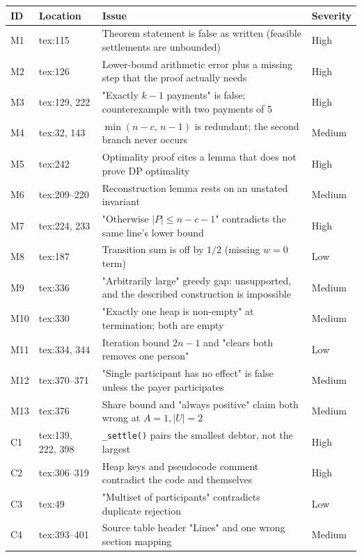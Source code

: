 \documentclass[11pt]{article}
\begin{document}
\begin{table}[H]
\centering
\begin{tabular}{>{\raggedright\arraybackslash}p{} >{\raggedright\arraybackslash}p{}
>{\raggedright\arraybackslash}p{} >{\raggedright\arraybackslash}p{}}
\toprule
ID & Location & Issue & Severity \\
\midrule
M1 & tex:115 & Theorem statement is false as written (feasible settlements are unbounded) & High \\
M2 & tex:126 & Lower-bound arithmetic error plus a missing step that the proof actually needs & High \\
M3 & tex:129, 222 & "Exactly $k-1$ payments" is false; counterexample with two payments of 5 & High \\
M4 & tex:32, 143 & $\min(n-c,\, n-1)$ is redundant; the second branch never occurs & Medium \\
M5 & tex:242 & Optimality proof cites a lemma that does not prove DP optimality & High \\
M6 & tex:209--220 & Reconstruction lemma rests on an unstated invariant & Medium \\
M7 & tex:224, 233 & "Otherwise $|P| \le n-c-1$" contradicts the same line's lower bound & High \\
M8 & tex:187 & Transition sum is off by $1/2$ (missing $w=0$ term) & Low \\
M9 & tex:336 & "Arbitrarily large" greedy gap: unsupported, and the described construction is impossible & Medium \\
M10 & tex:330 & "Exactly one heap is non-empty" at termination; both are empty & Medium \\
M11 & tex:334, 344 & Iteration bound $2n-1$ and "clears both removes one person" & Low \\
M12 & tex:370--371 & "Single participant has no effect" is false unless the payer participates & Medium \\
M13 & tex:376 & Share bound and "always positive" claim both wrong at $A=1, |U|=2$ & Medium \\
C1 & tex:139, 222, 398 & \texttt{\_settle()} pairs the smallest debtor, not the largest & High \\
C2 & tex:306--319 & Heap keys and pseudocode comment contradict the code and themselves & High \\
C3 & tex:49 & "Multiset of participants" contradicts duplicate rejection & Low \\
C4 & tex:393--401 & Source table header "Lines" and one wrong section mapping & Medium \\

\end{tabular}
\end{table}
\end{document}
